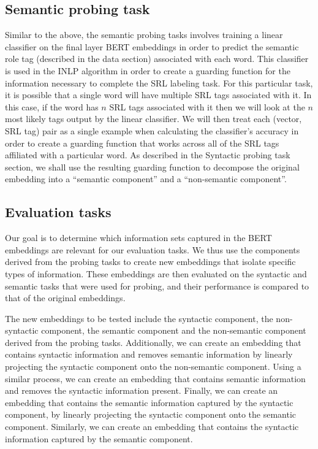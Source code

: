 \documentclass[11pt,a4paper]{article}
\begin{document}
\subsection{Semantic probing task}
\label{sec:semantics}

Similar to the above, the semantic probing tasks involves training a linear classifier on the final layer BERT embeddings in order to predict the semantic role tag (described in the data section) associated with each word. This classifier is used in the INLP algorithm in order to create a guarding function for the information necessary to complete the SRL labeling task. For this particular task, it is possible that a single word will have multiple SRL tags associated with it. In this case, if the word has $n$ SRL tags associated with it then we will look at the $n$ most likely tags output by the linear classifier. We will then treat each (vector, SRL tag) pair as a single example when calculating the classifier's accuracy in order to create a guarding function that works across all of the SRL tags affiliated with a particular word. As described in the Syntactic probing task section, we shall use the resulting guarding function to decompose the original embedding into a ``semantic component'' and a ``non-semantic component''. 

\subsection{Evaluation tasks}
\label{sec:eval}

Our goal is to determine which information sets captured in the BERT embeddings are relevant for our evaluation tasks. We thus use the components derived from the probing tasks to create new embeddings that isolate specific types of information. These embeddings are then evaluated on the syntactic and semantic tasks that were used for probing, and their performance is compared to that of the original embeddings. 

The new embeddings to be tested include the syntactic component, the non-syntactic component, the semantic component and the non-semantic component derived from the probing tasks. Additionally, we can create an embedding that contains syntactic information and removes semantic information by linearly projecting the syntactic component onto the non-semantic component. Using a similar process, we can create an embedding that contains semantic information and removes the syntactic information present. Finally, we can create an embedding that contains the semantic information captured by the syntactic component, by linearly projecting the syntactic component onto the semantic component. Similarly, we can create an embedding that contains the syntactic information captured by the semantic component. 
\end{document}
